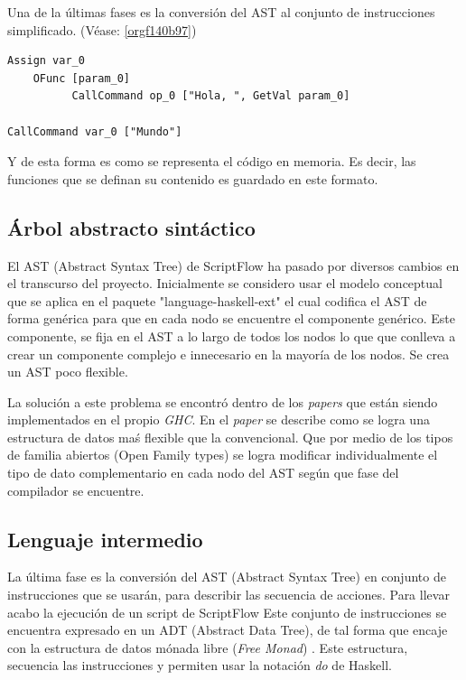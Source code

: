 \documentclass[11pt]{article}
\begin{document}
Una de la últimas fases es la conversión del AST al conjunto de
instrucciones simplificado. (Véase: \ref{orgf140b97})

\begin{verbatim}
Assign var_0
    OFunc [param_0]
          CallCommand op_0 ["Hola, ", GetVal param_0]

CallCommand var_0 ["Mundo"]
\end{verbatim}

Y de esta forma es como se representa el código en memoria. Es decir, las
funciones que se definan su contenido es guardado en este formato.

\subsection{Árbol abstracto sintáctico}
\label{sec:orgdd79121}

El AST (Abstract Syntax Tree) de ScriptFlow ha pasado por diversos cambios en el transcurso del proyecto. Inicialmente
se considero usar el modelo conceptual que se aplica en el paquete "language-haskell-ext" el cual codifica el AST de forma genérica
para que en cada nodo se encuentre el componente genérico. Este componente, se fija en el AST a lo largo de todos los nodos lo que
que conlleva a crear un componente complejo e innecesario en la mayoría de los nodos. Se crea un AST poco flexible.

La solución a este problema se encontró dentro de los \emph{papers} que están siendo implementados en el propio \emph{GHC}. En el \emph{paper} \cite{shayan-2017-trees}
se describe como se logra una estructura de datos maś flexible que la convencional. Que por medio de los tipos de familia abiertos (Open Family types)
se logra modificar individualmente el tipo de dato complementario en cada nodo del AST según que fase del compilador se encuentre.

\subsection{Lenguaje intermedio}
\label{sec:org878b15f}

\label{orgf140b97} La última fase es la conversión del AST (Abstract Syntax Tree) en conjunto de instrucciones
que se usarán, para describir las secuencia de acciones. Para llevar acabo la ejecución de un script de ScriptFlow
Este conjunto de instrucciones se encuentra expresado en un ADT (Abstract Data Tree), de tal forma que encaje con la estructura
de datos mónada libre (\emph{Free Monad}) \cite{free-monads}. Este estructura, secuencia las instrucciones y permiten usar la notación \emph{do} de Haskell.
\end{document}
